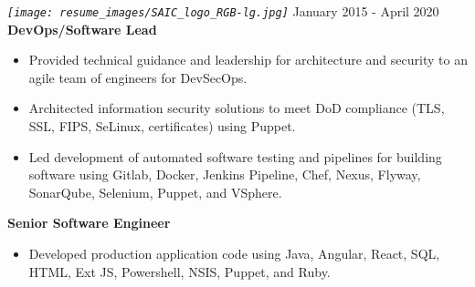 \documentclass[12pt, line, margin]{res}
\begin{document}
\begin{resume}
           \pagebreak
            {\sl
              \texttt{[image: resume\_images/SAIC\_logo\_RGB-lg.jpg]}
            }
            \hfill January 2015 - April 2020 \\
            \textbf{DevOps/Software Lead}
            \begin{itemize}  [nolistsep, noitemsep, topsep=0px, parsep=0px, partopsep=0px] %
              \item   Provided technical guidance and leadership for architecture \newline
                          and security to an agile team of engineers for DevSecOps.
              \item   Architected information security solutions to meet DoD \newline
                          compliance (TLS, SSL, FIPS, SeLinux, certificates) using Puppet.
              \item   Led development of automated software testing and pipelines \newline
                          for building software using Gitlab, Docker, Jenkins Pipeline, Chef,
                          Nexus, Flyway, SonarQube, Selenium, Puppet, and VSphere.
            \end{itemize}
            \vspace{-5mm} %
            \textbf{Senior Software Engineer}
            \begin{itemize}  [nolistsep, noitemsep, topsep=0px, parsep=0px, partopsep=0px] %
              \item   Developed production application code using Java, Angular, \newline 
                          React, SQL, HTML, Ext JS, Powershell, NSIS, Puppet, and Ruby.

\end{itemize}
\end{resume}
\end{document}

